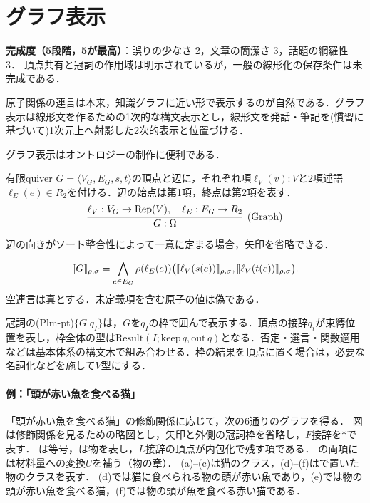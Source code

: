 \documentclass[../../main-detail.tex]{subfiles}
\begin{document}
\section{グラフ表示}\label{sec:graph-notation}
\begin{leftwavybox}
\textbf{完成度（5段階，5が最高）}：誤りの少なさ 2，文章の簡潔さ 3，話題の網羅性 3．
頂点共有と冠詞の作用域は明示されているが，一般の線形化の保存条件は未完成である．
\end{leftwavybox}
原子関係の連言は本来，知識グラフに近い形で表示するのが自然である．グラフ表示は線形文を作るための1次的な構文表示とし，線形文を発話・筆記を(慣習に基づいて)1次元上へ射影した2次的表示と位置づける．

グラフ表示はオントロジーの制作に便利である．

\begin{definition}[グラフ表示]
    有限quiver $G=\langle V_G,E_G,s,t\rangle$の頂点と辺に，それぞれ項$\ell_V(v):V$と2項述語$\ell_E(e)\in R_2$を付ける．辺の始点は第1項，終点は第2項を表す．
    \[
        \infer[\text{(Graph)}]{G:\Omega}{
            \ell_V:V_G\to\mathrm{Rep}(V),\quad \ell_E:E_G\to R_2
        }
    \]
    辺の向きがソート整合性によって一意に定まる場合，矢印を省略できる．
\end{definition}
\begin{definition}[グラフの解釈]
    \[
        \llbracket G\rrbracket_{\rho,\sigma}
        =\bigwedge_{e\in E_G}
        \rho(\ell_E(e))\bigl(\llbracket\ell_V(s(e))\rrbracket_{\rho,\sigma},
                              \llbracket\ell_V(t(e))\rrbracket_{\rho,\sigma}\bigr).
    \]
    空連言は真とする．未定義項を含む原子の値は偽である．
\end{definition}

冠詞の(Plm-pt)$\{G\;q_I\}$は，$G$を$q_I$の枠で囲んで表示する．頂点の接辞$q_i$が束縛位置を表し，枠全体の型は$\mathrm{Result}(I;\mathrm{keep}\,q,\mathrm{out}\,q)$となる．否定・選言・関数適用などは基本体系の構文木で組み合わせる．枠の結果を頂点に置く場合は，必要な名詞化などを施して$V$型にする．

\paragraph{例：「頭が赤い魚を食べる猫」}
「頭が赤い魚を食べる猫」の修飾関係に応じて，次の6通りのグラフを得る．
図は修飾関係を見るための略図とし，矢印と外側の冠詞枠を省略し，$F$接辞を$*$で表す．
は等号，は物を表し，$L$接辞の頂点が内包化で残す項である．
の両項には材料量への変換$U$を補う（物の章）．
(a)--(c)は猫のクラス，(d)--(f)はで置いた物のクラスを表す．
(d)では猫に食べられる物の頭が赤い魚であり，(e)では物の頭が赤い魚を食べる猫，(f)では物の頭が魚を食べる赤い猫である．
\end{document}
